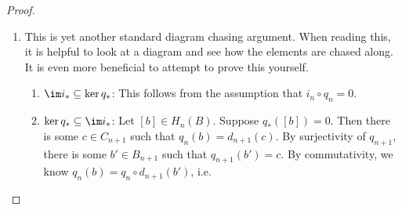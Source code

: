 \documentclass[a4paper]{article}
\theoremstyle{definition}
\begin{document}
\begin{proof}
\begin{enumerate}
\begin{enumerate}
\begin{align*}
            &= d_n \circ i_n (a) + d_n(y) \\
            &= i_{n - 1} \circ d_n (a) + d_n(y).
          \end{align*}
          Hence when we pull back $d_n(y')$ and $d_n(y)$ to $A_{n - 1}$, the results differ by the boundary $d_n(a)$, and hence produce the same homology class.
        \item Suppose $[x'] = [x]$. We want to show that $\partial_* [x] = \partial_*[x']$. This time, we add a layer above.
          \[
            \begin{tikzcd}
              0 \ar[r] & A_{n + 1} \ar[r, "i_{n + 1}"] \ar[d, "d_{n + 1}"] & B_{n + 1} \ar[r, "q_{n + 1}"] \ar[d, "d_{n + 1}"] & C_{n + 1} \ar[r] \ar[d, "d_{n + 1}"] & 0\\
              0 \ar[r] & A_n \ar[r, "i_n"] \ar[d, "d_n"] & B_n \ar[r, "q_n"] \ar[d, "d_n"] & C_n \ar[r] \ar[d, "d_n"] & 0\\
              0 \ar[r] & A_{n - 1} \ar[r, "i_{n - 1}"] & B_{n - 1} \ar[r, "q_{n - 1}"] & C_{n - 1} \ar[r] & 0
            \end{tikzcd}
          \]
          By definition, since $[x'] = [x]$, there is some $c \in C_{n + 1}$ such that
          \[
            x' = x + d_{n + 1} (c).
          \]
          By surjectivity of $q_{n + 1}$, we can write $c = q_{n + 1}(b)$ for some $b \in B_{n + 1}$. By commutativity of the squares, we know
          \[
            x' = x + q_n \circ d_{n + 1} (b).
          \]
          The next step of the proof is to find some $y$ such that $q_n (y) = x$. Then
          \[
            q_n(y + d_{n + 1} (b)) = x'.
          \]
          So the corresponding $y'$ is $y' = y + d_{n + 1}(b)$. So $d_n (y) = d_n(y')$, and hence $\partial_*[x] = \partial_* [x']$.
      \end{enumerate}
    \item This is yet another standard diagram chasing argument. When reading this, it is helpful to look at a diagram and see how the elements are chased along. It is even more beneficial to attempt to prove this yourself.
      \begin{enumerate}
        \item $\im i_* \subseteq \ker q_*$: This follows from the assumption that $i_n \circ q_n = 0$.
        \item $\ker q_* \subseteq \im i_*$: Let $[b] \in H_n(B)$. Suppose $q_*([b]) = 0$. Then there is some $c \in C_{n + 1}$ such that $q_n(b) = d_{n + 1}(c)$. By surjectivity of $q_{n + 1}$, there is some $b' \in B_{n + 1}$ such that $q_{n + 1}(b') = c$. By commutativity, we know $q_n(b) = q_n \circ d_{n + 1}(b')$, i.e.

\end{enumerate}
\end{enumerate}
\end{proof}
\end{document}
